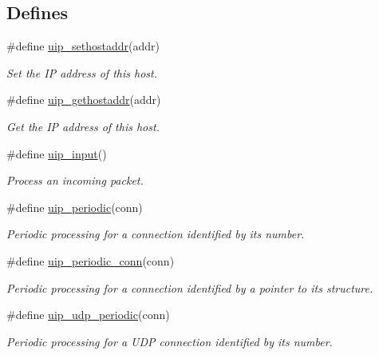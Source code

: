 \subsection*{Defines}
\begin{CompactItemize}
\item 
\#define \hyperlink{a00061_g12b467f314489259dd718228d0827a51}{uip\_\-sethostaddr}(addr)
\begin{CompactList}\small\item\em Set the IP address of this host. \item\end{CompactList}\item 
\#define \hyperlink{a00061_g20bc87e5c063c3f4b01547be6e5a0148}{uip\_\-gethostaddr}(addr)
\begin{CompactList}\small\item\em Get the IP address of this host. \item\end{CompactList}\item 
\#define \hyperlink{a00063_ga4360412ee9350fba725f98a137169fe}{uip\_\-input}()
\begin{CompactList}\small\item\em Process an incoming packet. \item\end{CompactList}\item 
\#define \hyperlink{a00063_g1024f8a5fa65e82bf848b2e6590d9628}{uip\_\-periodic}(conn)
\begin{CompactList}\small\item\em Periodic processing for a connection identified by its number. \item\end{CompactList}\item 
\#define \hyperlink{a00063_gbaf0bb2b6a4424b4eb69e45e457c2583}{uip\_\-periodic\_\-conn}(conn)
\begin{CompactList}\small\item\em Periodic processing for a connection identified by a pointer to its structure. \item\end{CompactList}\item 
\#define \hyperlink{a00063_g2c64c8c36bc84f9336f6a2184ea51883}{uip\_\-udp\_\-periodic}(conn)
\begin{CompactList}\small\item\em Periodic processing for a UDP connection identified by its number. \item\end{CompactList}\item 

\end{CompactItemize}
